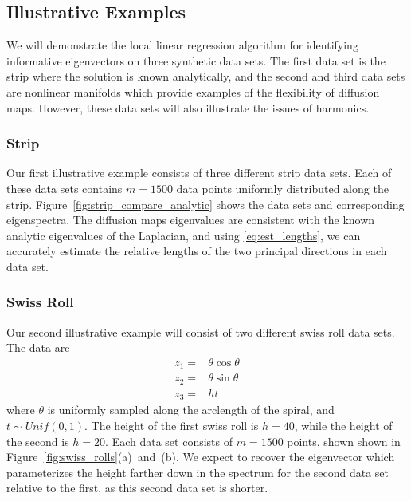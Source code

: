 \documentclass[preprint]{elsarticle}
\begin{document}
\subsection{Illustrative Examples}

We will demonstrate the local linear regression algorithm for identifying informative eigenvectors on three synthetic data sets. 
%
The first data set is the strip where the solution is known analytically, and the second and third data sets are nonlinear manifolds which provide examples of the flexibility of diffusion maps. 
%
However, these data sets will also illustrate the issues of harmonics. 

\subsubsection{Strip}

Our first illustrative example consists of three different strip data sets. 
%
Each of these data sets contains $m=1500$ data points uniformly distributed along the strip. 
%
Figure~\ref{fig:strip_compare_analytic} shows the data sets and corresponding eigenspectra.
%
The diffusion maps eigenvalues are consistent with the known analytic eigenvalues of the Laplacian, and using \eqref{eq:est_lengths}, we can accurately estimate the relative lengths of the two principal directions in each data set. 

\subsubsection{Swiss Roll}

Our second illustrative example will consist of two different swiss roll data sets.
%
The data are
\begin{equation}
\begin{aligned}
z_1 =& \theta \cos \theta \\
z_2 =& \theta \sin \theta \\
z_3 =& h t
\end{aligned}
\end{equation}
%
where $\theta$ is uniformly sampled along the arclength of the spiral, and $t \sim Unif(0,1)$. 
%
The height of the first swiss roll is $h = 40$, while the height of the second is $h = 20$. 
%
Each data set consists of $m=1500$ points, shown shown in Figure~\ref{fig:swiss_rolls}(a)~and~(b).
%
We expect to recover the eigenvector which parameterizes the height farther down in the spectrum for the second data set relative to the first, as this second data set is shorter.
\end{document}
